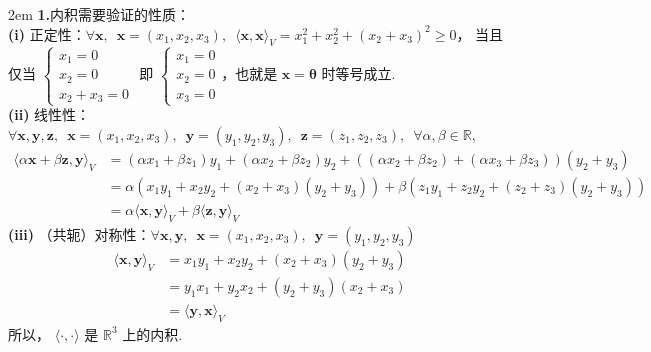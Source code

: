 \documentclass[UTF8,14pt,normal]{ctexart}
\begin{document}
    \hangindent 2em
    \noindent
    \textbf{1.}内积需要验证的性质：\\
    \textbf{(i)} 正定性：$\forall \boldsymbol{x}, \enspace \boldsymbol{x} = (x_{1}, x_{2}, x_{3}), \enspace 
    \langle \boldsymbol{x}, \boldsymbol{x} \rangle_V = x^{2}_{1} + x^{2}_{2} + (x_{2} + x_{3})^{2} \geqslant 0$，
    当且仅当 $\begin{cases}
        x_{1} = 0 \\
        x_{2} = 0 \\
        x_{2} + x_{3} = 0
    \end{cases}$ 即 $\begin{cases}
        x_{1} = 0 \\
        x_{2} = 0 \\
        x_{3} = 0
    \end{cases}$，也就是 $\boldsymbol{x} = \boldsymbol{\theta}$ 时等号成立.\\
    \textbf{(ii)} 线性性：$\forall \boldsymbol{x}, \boldsymbol{y}, \boldsymbol{z}, \enspace 
    \boldsymbol{x} = (x_{1}, x_{2}, x_{3}), \enspace \boldsymbol{y} = (y_{1}, y_{2}, y_{3}), \enspace \boldsymbol{z} = (z_{1}, z_{2}, z_{3}), \enspace
    \forall \alpha, \beta \in \mathbb{R}$, \\
    \begin{align*}
        \langle \alpha\boldsymbol{x} + \beta \boldsymbol{z}, \boldsymbol{y} \rangle_V 
        & = (\alpha x_{1} + \beta z_{1})y_{1} + (\alpha x_{2} + \beta z_{2})y_{2} + ((\alpha x_{2} + \beta z_{2}) + (\alpha x_{3} + \beta z_{3}))(y_{2} + y_{3}) \\ 
        & = \alpha(x_{1}y_{1} + x_{2}y_{2} + (x_{2} + x_{3})(y_{2} + y_{3})) + \beta(z_{1}y_{1} + z_{2}y_{2} + (z_{2} + z_{3})(y_{2} + y_{3})) \\ 
        & = \alpha \langle \boldsymbol{x}, \boldsymbol{y} \rangle_V + \beta \langle \boldsymbol{z}, \boldsymbol{y}\rangle_V 
    \end{align*}
    \textbf{(iii)} （共轭）对称性：$\forall \boldsymbol{x}, \boldsymbol{y}, \enspace 
    \boldsymbol{x} = (x_{1}, x_{2}, x_{3}), \enspace \boldsymbol{y} = (y_{1}, y_{2}, y_{3})$
    \begin{align*}
        \langle \boldsymbol{x}, \boldsymbol{y} \rangle_V 
        & = x_{1}y_{1} + x_{2}y_{2} + (x_{2} + x_{3})(y_{2} + y_{3}) \\
        & = y_{1}x_{1} + y_{2}x_{2} + (y_{2} + y_{3})(x_{2} + x_{3}) \\ 
        & = \langle \boldsymbol{y}, \boldsymbol{x} \rangle_V 
    \end{align*}
    所以， $\langle \cdot, \cdot \rangle$ 是 $\mathbb{R}^{3}$ 上的内积.
\end{document}
